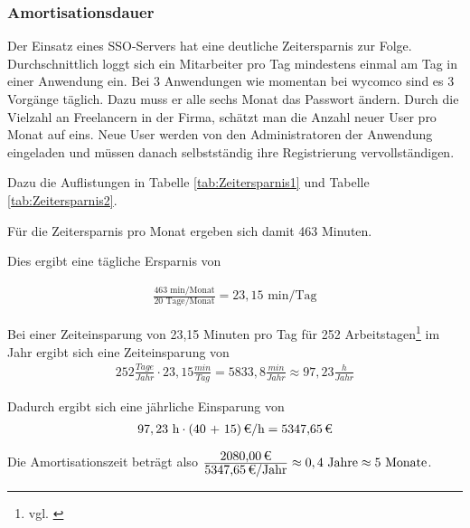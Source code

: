 

\subsubsection{Amortisationsdauer}
\label{sec:Amortisationsdauer}

Der Einsatz eines \ac{SSO}-Servers hat eine deutliche Zeitersparnis zur Folge. Durchschnittlich loggt sich ein Mitarbeiter pro Tag mindestens einmal am Tag in einer Anwendung ein. Bei 3 Anwendungen wie momentan bei wycomco sind es 3 Vorgänge täglich. Dazu muss er alle sechs Monat das Passwort ändern. Durch die Vielzahl an Freelancern in der Firma, schätzt man die Anzahl neuer User pro Monat auf eins. Neue User werden von den Administratoren der Anwendung eingeladen und müssen danach selbstständig ihre Registrierung vervollständigen. 

Dazu die Auflistungen in Tabelle \ref{tab:Zeitersparnis1} und Tabelle \ref{tab:Zeitersparnis2}.



Für die Zeitersparnis pro Monat ergeben sich damit 463 Minuten. 

Dies ergibt eine tägliche Ersparnis von

\begin{eqnarray}
\frac{463 \mbox{ min/Monat}}{20 \mbox{ Tage/Monat}} = 23,15 \mbox{ min/Tag}
\end{eqnarray}

Bei einer Zeiteinsparung von 23,15 Minuten pro Tag für 252 Arbeitstagen\footnote{vgl. \cite{arbeitstage}} im Jahr ergibt sich eine Zeiteinsparung von 
\begin{eqnarray}
252 \frac{Tage}{Jahr} \cdot 23,15 \frac{min}{Tag} = 5833,8 \frac{min}{Jahr} \approx 97,23 \frac{h}{Jahr} 
\end{eqnarray}

Dadurch ergibt sich eine jährliche Einsparung von 
\begin{eqnarray}
97,23 \mbox{ h} \cdot \eur{(40 + 15)}{\mbox{/h}} = \eur{5347,65}
\end{eqnarray}

Die Amortisationszeit beträgt also $\frac{\eur{2080,00}}{\eur{5347,65}\mbox{/Jahr}} \approx 0,4 \mbox{ Jahre} \approx 5 \mbox{ Monate}$.

